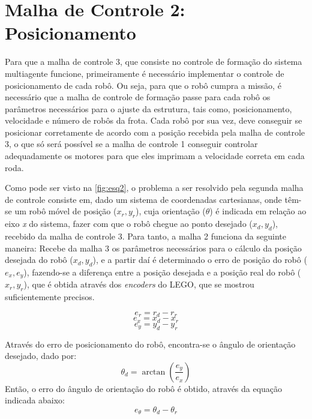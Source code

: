 \section{Malha de Controle 2: Posicionamento}
\label{sec:malha2 } 
Para que a malha de controle 3, que consiste no controle de formação do sistema multiagente funcione, primeiramente é necessário implementar o controle de posicionamento de cada robô. Ou seja, para que o robô cumpra a missão, é necessário que a malha de controle de formação passe para cada robô os parâmetros necessários para o ajuste da estrutura, tais como, posicionamento, velocidade e número de robôs da frota. Cada robô por sua vez, deve conseguir se posicionar corretamente de acordo com a posição recebida pela malha de controle 3, o que só será possível se a malha de controle 1 conseguir controlar adequadamente os motores para que eles imprimam a velocidade correta em cada roda.

Como pode ser visto na \autoref{fig:esq2}, o problema a ser resolvido pela segunda malha de controle consiste em, dado um sistema de coordenadas cartesianas, onde têm-se um robô móvel de posição (\emph{$x_{r},y_{r}$}), cuja orientação (\emph{$\theta$}) é indicada em relação ao eixo \emph{x} do sistema, %
fazer com que o robô chegue ao ponto desejado (\emph{$x_{d},y_{d}$}), recebido da malha de controle 3. Para tanto, a malha 2 funciona da seguinte maneira: Recebe da malha 3 os parâmetros necessários para o cálculo da posição desejada do robô (\emph{$x_{d},y_{d}$}), e a partir daí é determinado o erro de posição do robô (\emph{$e_{x},e_{y}$}), fazendo-se a diferença entre a posição desejada e a posição real do robô (\emph{$x_{r},y_{r}$}), que é obtida através dos \emph{encoders} do LEGO\textregistered, que se mostrou suficientemente precisos.

\begin{equation}
e_{r} = r_{d} - r_{r}
\label{eq:errr}
\end{equation}
\begin{equation}
e_{x} = x_{d} - x_{r}
\label{eq:errx}
\end{equation}
\begin{equation}
e_{y} = y_{d} - y_{r}
\label{eq:erry}
\end{equation}

Através do erro de posicionamento do robô, encontra-se o ângulo de orientação desejado, dado por: %
\begin{equation}
\theta_{d} = \arctan(\dfrac{e_{y}}{e_{x}})
\label{eq:thetad}
\end{equation}
Então, o erro do ângulo de orientação do robô é obtido, através da %
equação indicada abaixo: 
\begin{equation}
e_{\theta} = \theta_{d} - \theta_{r}
\label{eq:errtheta}
\end{equation}

